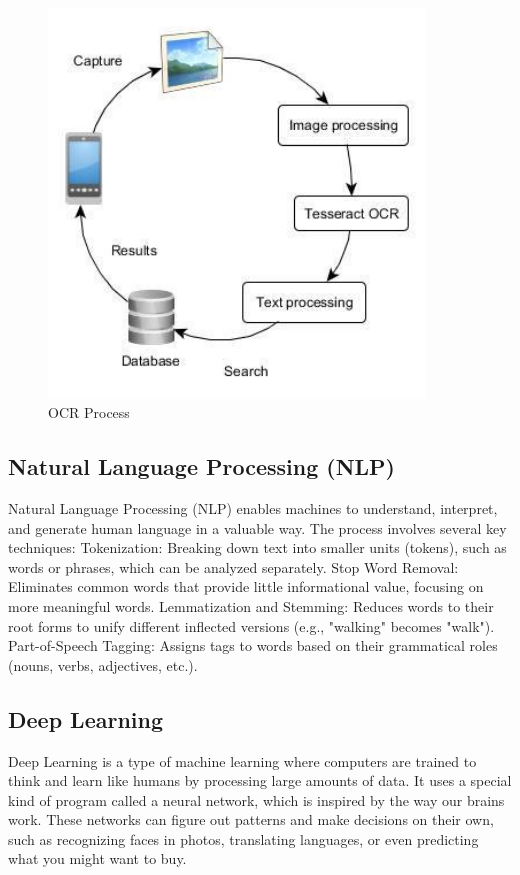 \documentclass[12pt,oneside,openright,a4paper]{cpe-english-project}
\begin{document}
\begin{figure}[H]
\centering
\includegraphics[width=10cm]{./assets/OCR-Process.png}
\caption{OCR Process}\label{fig:figure-2.2}
\end{figure}

\subsection{Natural Language Processing (NLP)} Natural Language Processing (NLP) enables machines to understand, interpret, and generate human language in a valuable way. The process involves several key techniques: Tokenization: Breaking down text into smaller units (tokens), such as words or phrases, which can be analyzed separately. Stop Word Removal: Eliminates common words that provide little informational value, focusing on more meaningful words. Lemmatization and Stemming: Reduces words to their root forms to unify different inflected versions (e.g., "walking" becomes "walk"). Part-of-Speech Tagging: Assigns tags to words based on their grammatical roles (nouns, verbs, adjectives, etc.).

\subsection{Deep Learning} Deep Learning is a type of machine learning where computers are trained to think and learn like humans by processing large amounts of data. It uses a special kind of program called a neural network, which is inspired by the way our brains work. These networks can figure out patterns and make decisions on their own, such as recognizing faces in photos, translating languages, or even predicting what you might want to buy.
\end{document}
